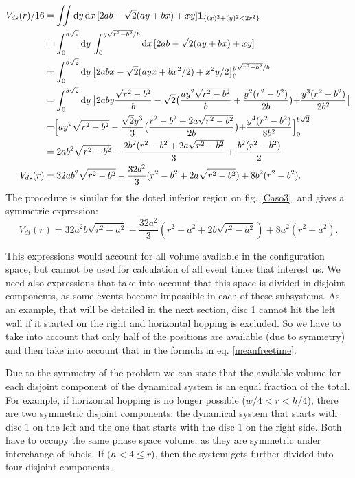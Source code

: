 \documentclass[superscriptaddress,pre,reprint,showpacs,onecolumn]{revtex4-1}
\newcommand{\rd}[1]{\mathrm{d}{#1} \,}
\newcommand{\indicator}[1]{\mathbf{1}_{ \{   #1 \} } }
\begin{document}
\begin{equation}
  \begin{split}
    V_{ds}(r) /16 &=\iint \rd y \rd x [2ab-\sqrt{2}(ay+bx)+xy] \indicator{(x)^2+(y)^2<2r^2 }\\
    &=\int_0^{b\sqrt{2}}\rd y \int_{0}^{y\sqrt{r^2-b^2}/b} \rd x [2ab-\sqrt{2}(ay+bx)+xy] \\
   &=\int_0^{b\sqrt{2}}\rd y \bigl[2abx-\sqrt{2}(ayx+bx^2/2)+x^2y/2\bigr]_{0}^{y\sqrt{r^2-b^2}/b} \\
      &=\int_0^{b\sqrt{2}}\rd y
        \bigr[
          2aby\frac{\sqrt{r^2-b^2}}{b}
          -\sqrt{2}
          \bigr(
          \frac{ay^2\sqrt{r^2-b^2}}{b}
            +\frac{y^2(r^2-b^2)}{2b}
            \bigl)
           +\frac{y^3(r^2-b^2)}{2b^2}
           \bigl]\\
        &= \Bigr[ay^2\sqrt{r^2-b^2}-
          \frac{\sqrt{2}y^3}{3}
          \bigr(
          \frac{r^2-b^2+2a\sqrt{r^2-b^2}}{2b}
            \bigl)
            +\frac{y^4(r^2-b^2)}{8b^2}
            \Bigl]_0^{b\sqrt{2}}\\
          &=2ab^2\sqrt{r^2-b^2}
          -\frac{2b^2(r^2-b^2+2a\sqrt{r^2-b^2}}{3}+\frac{b^2(r^2-b^2)}{2}\\
          V_{ds}(r)&=32ab^2\sqrt{r^2-b^2} -\frac{32
            b^2}{3}(r^2-b^2+2a\sqrt{r^2-b^2}) +8b^2(r^2-b^2).
  \end{split}
  \end{equation}
The procedure is similar for the doted inferior region on fig. \ref{Caso3},
and gives a symmetric expression:
\begin{equation}
          V_{di}(r)=32a^2b\sqrt{r^2-a^2} -\frac{32
            a^2}{3}(r^2-a^2+2b\sqrt{r^2-a^2}) +8a^2(r^2-a^2).
\end{equation}

This expressions would account for all volume available in the configuration space, but
cannot be used for calculation of all event times that interest us. We need also
expressions that take into account that this space is divided in disjoint components,
as some events become impossible in each of these subsystems. As an example,
that will be detailed in the next section, disc 1 cannot hit the left wall if
it started on the right and horizontal hopping is excluded. So we have to
take into account that only half of the positions are available (due to symmetry)
and then take into account that in the formula in eq. \ref{meanfreetime}.

Due to the symmetry of the problem we can state that the available volume
for each disjoint component of the dynamical system is an equal fraction
of the total. For example, if horizontal hopping is no longer possible
($w/4<r<h/4$), there are two symmetric disjoint components: the dynamical system
that starts with disc 1 on the left and the one that starts with the disc 1 on
the right side. Both have to occupy the same phase space volume, as they are
symmetric under interchange of labels. If $(h<4\leq r$), then the system gets further
divided into four disjoint components. 
\end{document}

